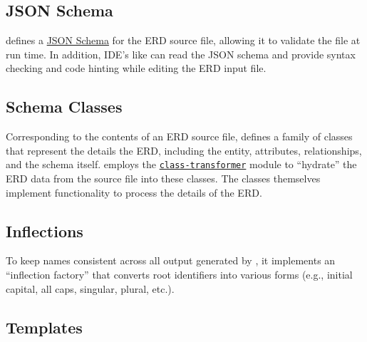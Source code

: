 \documentclass{article}
\begin{document}
\subsection{JSON Schema}
\label{sec:json-schema}

\boil{} defines
a \href{https://json-schema.org/}{JSON Schema}
for the ERD source file,
allowing it to validate the file at run time.
In addition,
IDE's like
\webstorm{}
can read the JSON schema
and provide syntax checking and code hinting
while editing the ERD input file.


\subsection{Schema Classes}
\label{sec:schema-classes}

Corresponding to the contents of an ERD source file,
\boil{}
defines a family of classes
that represent the details the ERD,
including the entity, attributes, relationships,
and the schema itself.
\boil{} employs
the \href{https://www.npmjs.com/package/class-transformer}{\texttt{class-transformer}}
module to ``hydrate''
the ERD data from the source file
into these classes.
The classes themselves implement functionality
to process the details of the ERD.


\subsection{Inflections}
\label{sec:inflections}

To keep names consistent across all output
generated by \boil,
it implements an ``inflection factory''
that converts root identifiers
into various forms
(e.g., initial capital, all caps, singular, plural, etc.).


\subsection{Templates}
\label{sec:templates}
\end{document}
